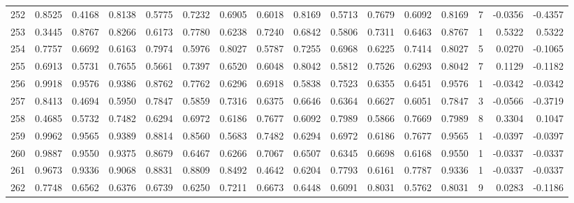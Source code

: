 \begin{tabular}{lrrrrrrrrrrrrrrr}
252 &      0.8525 &  0.4168 &  0.8138 &  0.5775 &  0.7232 &  0.6905 &  0.6018 &  0.8169 &  0.5713 &  0.7679 &   0.6092 &     0.8169 &      7 &                   -0.0356 &                    -0.4357 \\
253 &      0.3445 &  0.8767 &  0.8266 &  0.6173 &  0.7780 &  0.6238 &  0.7240 &  0.6842 &  0.5806 &  0.7311 &   0.6463 &     0.8767 &      1 &                    0.5322 &                     0.5322 \\
254 &      0.7757 &  0.6692 &  0.6163 &  0.7974 &  0.5976 &  0.8027 &  0.5787 &  0.7255 &  0.6968 &  0.6225 &   0.7414 &     0.8027 &      5 &                    0.0270 &                    -0.1065 \\
255 &      0.6913 &  0.5731 &  0.7655 &  0.5661 &  0.7397 &  0.6520 &  0.6048 &  0.8042 &  0.5812 &  0.7526 &   0.6293 &     0.8042 &      7 &                    0.1129 &                    -0.1182 \\
256 &      0.9918 &  0.9576 &  0.9386 &  0.8762 &  0.7762 &  0.6296 &  0.6918 &  0.5838 &  0.7523 &  0.6355 &   0.6451 &     0.9576 &      1 &                   -0.0342 &                    -0.0342 \\
257 &      0.8413 &  0.4694 &  0.5950 &  0.7847 &  0.5859 &  0.7316 &  0.6375 &  0.6646 &  0.6364 &  0.6627 &   0.6051 &     0.7847 &      3 &                   -0.0566 &                    -0.3719 \\
258 &      0.4685 &  0.5732 &  0.7482 &  0.6294 &  0.6972 &  0.6186 &  0.7677 &  0.6092 &  0.7989 &  0.5866 &   0.7669 &     0.7989 &      8 &                    0.3304 &                     0.1047 \\
259 &      0.9962 &  0.9565 &  0.9389 &  0.8814 &  0.8560 &  0.5683 &  0.7482 &  0.6294 &  0.6972 &  0.6186 &   0.7677 &     0.9565 &      1 &                   -0.0397 &                    -0.0397 \\
260 &      0.9887 &  0.9550 &  0.9375 &  0.8679 &  0.6467 &  0.6266 &  0.7067 &  0.6507 &  0.6345 &  0.6698 &   0.6168 &     0.9550 &      1 &                   -0.0337 &                    -0.0337 \\
261 &      0.9673 &  0.9336 &  0.9068 &  0.8831 &  0.8809 &  0.8492 &  0.4642 &  0.6204 &  0.7793 &  0.6161 &   0.7787 &     0.9336 &      1 &                   -0.0337 &                    -0.0337 \\
262 &      0.7748 &  0.6562 &  0.6376 &  0.6739 &  0.6250 &  0.7211 &  0.6673 &  0.6448 &  0.6091 &  0.8031 &   0.5762 &     0.8031 &      9 &                    0.0283 &                    -0.1186 \\

\end{tabular}
